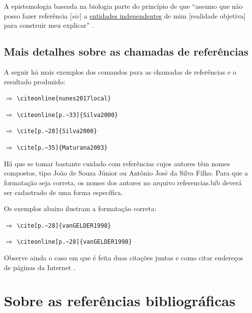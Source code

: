 \begin{apendicesenv}
    A epistemologia baseada na biologia parte do princípio de que ``assumo que não posso fazer referência [\textit{sic}] a \underline{entidades independentes} de mim [realidade objetiva] para construir meu explicar'' \cite[p.~35, comentários e grifo nosso]{Maturana2003}.

    \section{Mais detalhes sobre as chamadas de referências}
    \label{sec_chamadas_referencias}

    A seguir há mais exemplos dos comandos para as chamadas de referências e o resultado produzido:

     $\Longrightarrow$ \verb|\citeonline{nunes2017local}|

     $\Longrightarrow$ \verb|\citeonline[p.~33]{Silva2000}|

    \cite[p.~28]{Silva2000} $\Longrightarrow$ \verb|\cite[p.~28]{Silva2000}|

    \cite[p.~35]{Maturana2003} $\Longrightarrow$ \verb|\cite[p.~35]{Maturana2003}|

    \vspace{3em}

    Há que se tomar bastante cuidado com referências cujos autores têm nomes compostos, tipo João de Souza Júnior ou Antônio José da Silva Filho.
    Para que a formatação seja correta, os nomes dos autores no arquivo {\color{red} referencias.bib} deverá ser cadastrado de uma forma específica.

    Os exemplos abaixo ilustram a formatação correta:

    \cite[p.~28]{vanGELDER1998} $\Longrightarrow$ \verb|\cite[p.~28]{vanGELDER1998}|

     $\Longrightarrow$ \verb|\citeonline[p.~28]{vanGELDER1998}|

    \vspace{3em}

    Observe ainda o caso em que é feita duas citações juntas \cite{Silva2000, nunes2017local} e como citar endereços de páginas da Internet \cite{IRL2014}.


    \chapter{Sobre as referências bibliográficas}
    \label{chap_sobre_as_referencias_bibliograficas}


\end{apendicesenv}
